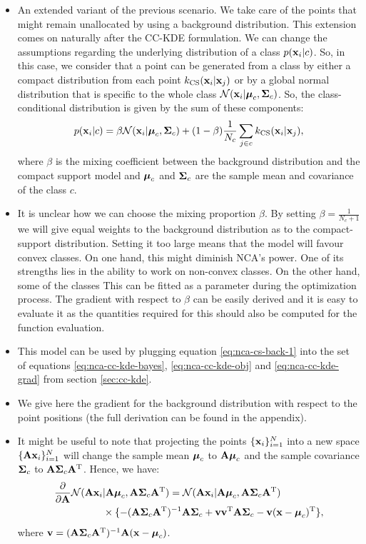 \begin{itemize}
	\item An extended variant of the previous scenario. We take care of the points that might remain unallocated by using a background distribution. This extension comes on naturally after the CC-KDE formulation. We can change the assumptions regarding the underlying distribution of a class $p(\mathbf{x}_i|c)$. So, in this case, we consider that a point can be generated from a class by either a compact distribution from each point $k_\text{CS}(\mathbf{x}_i|\mathbf{x}_j)$ or by a global normal distribution that is specific to the whole class $\mathcal{N}(\mathbf{x}_i|\mbox{\boldmath $\mu$}_c,\mbox{\boldmath $\Sigma$}_c)$. So, the class-conditional distribution is given by the sum of these components:
	\begin{align}
		p(\mathbf{x}_i|c) = \beta \mathcal{N}(\mathbf{x}_i|\mbox{\boldmath $\mu$}_c,\mbox{\boldmath $\Sigma$}_c) + (1-\beta) \frac{1}{N_c}\sum_{j\in c} k_\text{CS}(\mathbf{x}_i|\mathbf{x}_j),
		\label{eq:nca-cs-back-1}
	\end{align}
	where $\beta$ is the mixing coefficient between the background distribution and the compact support model and $\mbox{\boldmath $\mu$}_c$ and $\mbox{\boldmath $\Sigma$}_c$ are the sample mean and covariance of the class $c$.
	\item It is unclear how we can choose the mixing proportion $\beta$. By setting $\beta = \frac{1}{N_c+1}$ we will give equal weights to the background distribution as to the compact-support distribution. Setting it too large means that the model will favour convex classes. On one hand, this might diminish NCA's power. One of its strengths lies in the ability to work on non-convex classes. On the other hand, some of the classes  This can be fitted as a parameter during the optimization process. The gradient with respect to $\beta$ can be easily derived and it is easy to evaluate it as the quantities required for this should also be computed for the function evaluation. 
	\item This model can be used by plugging equation \ref{eq:nca-cs-back-1} into the set of equations \ref{eq:nca-cc-kde-bayes}, \ref{eq:nca-cc-kde-obj} and \ref{eq:nca-cc-kde-grad} from section \ref{sec:cc-kde}. 
	\item We give here the gradient for the background distribution with respect to the point positions (the full derivation can be found in the appendix). 
	\item It might be useful to note that projecting the points $\{\mathbf{x}_i\}_{i=1}^N$ into a new space $\{\mathbf{A}\mathbf{x}_i\}_{i=1}^N$ will change the sample mean $\mbox{\boldmath $\mu$}_c$ to $\mathbf{A}\mbox{\boldmath $\mu$}_c$ and the sample covariance $\mbox{\boldmath $\Sigma$}_c$ to $\mathbf{A}\mbox{\boldmath $\Sigma$}_c\mathbf{A}^\mathrm{T}$. Hence, we have:
	\begin{align}
		\frac{\partial}{\partial \mathbf{A}} \mathcal{N}(\mathbf{A}\mathbf{x}_i&|\mathbf{A}\mbox{\boldmath $\mu$}_c, \mathbf{A}\mbox{\boldmath $\Sigma$}_c \mathbf{A}^\mathrm{T}) = \mathcal{N}(\mathbf{A}\mathbf{x}_i|\mathbf{A}\mbox{\boldmath $\mu$}_c, \mathbf{A}\mbox{\boldmath $\Sigma$}_c \mathbf{A}^\mathrm{T})\notag\\
		&\times \{ -(\mathbf{A}\mbox{\boldmath $\Sigma$}_c \mathbf{A}^\mathrm{T})^{-1}\mathbf{A}\mbox{\boldmath $\Sigma$}_c
		+\mathbf{v} \mathbf{v} ^ \mathrm{T} \mathbf{A} \mbox{\boldmath $\Sigma$}_c - \mathbf{v} (\mathbf{x} - \mbox{\boldmath $\mu$}_c)^\mathrm{T}
		\},
	\end{align}
	where $\mathbf{v} = (\mathbf{A}\mbox{\boldmath $\Sigma$}_c \mathbf{A}^\mathrm{T})^{-1}\mathbf{A}(\mathbf{x} - \mbox{\boldmath $\mu$}_c)$.
\end{itemize}
